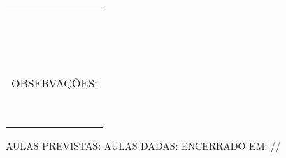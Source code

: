 \begin{small}
\begin{tabular}{|l|l|l|l|}
       \hline
       &&& \\
       \hline
       &&& \\
       \hline
       &&& \\
       \hline
       &&& \\
       \hline
       &&& \\
       \hline
       &&& \\
       \hline
       &&& \\
       \hline
       &&& \\
       \hline
       &&& \\
       \hline
       &&& \\
       \hline
       &&& \\
       \hline
       &&& \\
       \hline
       &&& \\
       \hline
       &&& \\
       \hline
       &&& \\
       \hline
       &&& \\
       \hline
       &&& \\
        \hline
       \multicolumn{4}{|l|}{OBSERVA\c{C}\~OES:} \\
       \multicolumn{4}{|l|}{} \\
       \hline
       \multicolumn{4}{|l|}{} \\
       \hline
       \multicolumn{4}{|l|}{} \\
       \hline
       \multicolumn{4}{|l|}{} \\
       \hline
       \multicolumn{4}{|l|}{} \\
       \hline
       \multicolumn{4}{|l|}{} \\
       \hline
       \multicolumn{4}{|l|}{} \\
       \hline
       \multicolumn{4}{|l|}{} \\
       \hline
    \end{tabular}

    \vspace{0.5cm}

    \begin{flushleft}
       \small{AULAS PREVISTAS:} \underline{\hspace{1.5cm}} \hspace{1.5cm}
       \small{AULAS DADAS:} \underline{\hspace{1.5cm}} \hspace{0.5cm} 
       \small{ENCERRADO EM:} \underline{\hspace{1.5cm}}/\underline{\hspace{1.5cm}}/\underline{\hspace{1.5cm}} \\
    \end{flushleft}
\end{small}

